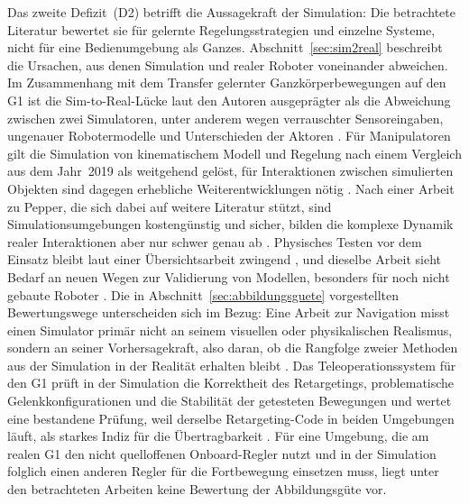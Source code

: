 %
Das zweite Defizit~(D2) betrifft die Aussagekraft der Simulation: Die betrachtete Literatur bewertet sie für gelernte Regelungsstrategien und einzelne Systeme, nicht für eine Bedienumgebung als Ganzes.
Abschnitt~\ref{sec:sim2real} beschreibt die Ursachen, aus denen Simulation und realer Roboter voneinander abweichen.
Im Zusammenhang mit dem Transfer gelernter Ganzkörperbewegungen auf den G1 ist die Sim-to-Real-Lücke laut den Autoren ausgeprägter als die Abweichung zwischen zwei Simulatoren, unter anderem wegen verrauschter Sensoreingaben, ungenauer Robotermodelle und Unterschieden der Aktoren \cite{He2025}.
Für Manipulatoren gilt die Simulation von kinematischem Modell und Regelung nach einem Vergleich aus dem Jahr~2019 als weitgehend gelöst, für Interaktionen zwischen simulierten Objekten sind dagegen erhebliche Weiterentwicklungen nötig \cite{Collins2019}.
Nach einer Arbeit zu Pepper, die sich dabei auf weitere Literatur stützt, sind Simulationsumgebungen kostengünstig und sicher, bilden die komplexe Dynamik realer Interaktionen aber nur schwer genau ab \cite{Sekkat2024}.
Physisches Testen vor dem Einsatz bleibt laut einer Übersichtsarbeit zwingend \cite{Choi2021}, und dieselbe Arbeit sieht Bedarf an neuen Wegen zur Validierung von Modellen, besonders für noch nicht gebaute Roboter \cite{Choi2021}.
Die in Abschnitt~\ref{sec:abbildungsguete} vorgestellten Bewertungswege unterscheiden sich im Bezug: Eine Arbeit zur Navigation misst einen Simulator primär nicht an seinem visuellen oder physikalischen Realismus, sondern an seiner Vorhersagekraft, also daran, ob die Rangfolge zweier Methoden aus der Simulation in der Realität erhalten bleibt \cite{Kadian2020}.
Das Teleoperationssystem für den G1 prüft in der Simulation die Korrektheit des Retargetings, problematische Gelenkkonfigurationen und die Stabilität der getesteten Bewegungen \cite{Durrani2026} und wertet eine bestandene Prüfung, weil derselbe Retargeting-Code in beiden Umgebungen läuft, als starkes Indiz für die Übertragbarkeit \cite{Durrani2026}.
Für eine Umgebung, die am realen G1 den nicht quelloffenen Onboard-Regler nutzt und in der Simulation folglich einen anderen Regler für die Fortbewegung einsetzen muss, liegt unter den betrachteten Arbeiten keine Bewertung der Abbildungsgüte vor.
